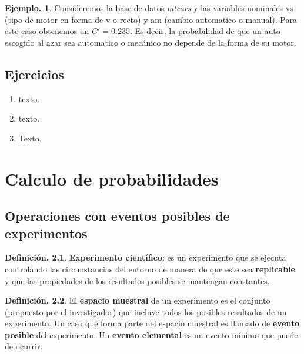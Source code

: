 \documentclass[]{book}
\theoremstyle{definition}
\newtheorem{definition}{Definición.}[chapter]
\theoremstyle{definition}
\newtheorem{example}{Ejemplo.}[chapter]
\theoremstyle{definition}
\theoremstyle{remark}
\begin{document}
\begin{example}
\protect\hypertarget{exm:unnamed-chunk-84}{}{\label{exm:unnamed-chunk-84} }
Consideremos la base de datos \emph{mtcars} y las variables nominales vs (tipo
de motor en forma de v o recto) y am (cambio automatico o manual). Para
este caso obtenemos un \(C'=0.235\). Es decir, la probabilidad de que un
auto escogido al azar sea automatico o mecánico no depende de la forma de
su motor.
\end{example}

\hypertarget{ejercicios}{%
\section{Ejercicios}\label{ejercicios}}

\begin{enumerate}
\def\labelenumi{\arabic{enumi}.}
\item
  texto.
\item
  texto.
\item
  Texto.
\end{enumerate}

\hypertarget{prob}{%
\chapter{Calculo de probabilidades}\label{prob}}

\hypertarget{operaciones-con-eventos-posibles-de-experimentos}{%
\section{Operaciones con eventos posibles de experimentos}\label{operaciones-con-eventos-posibles-de-experimentos}}

\begin{definition}
\protect\hypertarget{def:unnamed-chunk-85}{}{\label{def:unnamed-chunk-85} }
\textbf{Experimento científico}: es un experimento que se
ejecuta controlando
las circunstancias del entorno de manera de que este sea
\textbf{replicable} y
que las propiedades de los resultados posibles se
mantengan constantes.
\end{definition}

\begin{definition}
\protect\hypertarget{def:unnamed-chunk-86}{}{\label{def:unnamed-chunk-86} }
El \textbf{espacio muestral} de un experimento es el conjunto
(propuesto por el
investigador) que incluye todos los posibles resultados
de un experimento. Un caso que forma parte del espacio
muestral es llamado de \textbf{evento posible} del
experimento.
Un \textbf{evento elemental} es un evento mínimo que puede de
ocurrir.
\end{definition}
\end{document}
